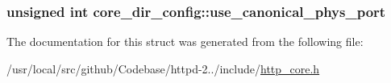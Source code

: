 \subsubsection[{\texorpdfstring{use\+\_\+canonical\+\_\+phys\+\_\+port}{use_canonical_phys_port}}]{\setlength{\rightskip}{0pt plus 5cm}unsigned {\bf int} core\+\_\+dir\+\_\+config\+::use\+\_\+canonical\+\_\+phys\+\_\+port}\hypertarget{structcore__dir__config_ae6ec6649adc3fd8686be3b7306a1765f}{}\label{structcore__dir__config_ae6ec6649adc3fd8686be3b7306a1765f}


The documentation for this struct was generated from the following file\+:\begin{DoxyCompactItemize}
\item 
/usr/local/src/github/\+Codebase/httpd-\/2../include/\hyperlink{http__core_8h}{http\+\_\+core.\+h}\end{DoxyCompactItemize}
